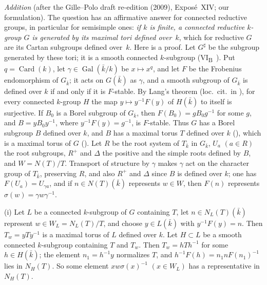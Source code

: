 \emph{Addition} (after the Gille--Polo draft re-edition (2009), Exposé~XIV; our formulation). The question
has an affirmative answer for connected reductive groups, in particular for semisimple ones: \emph{if \(k\) is
finite, a connected reductive \(k\)-group \(G\) is generated by its maximal tori defined over~\(k\)}, which for
reductive \(G\) are its Cartan subgroups defined over~\(k\). Here is a proof. Let \(G^\sharp\) be the subgroup
generated by these tori; it is a smooth connected \(k\)-subgroup
\textup{(VI\textsubscript{B}~)}. Put \(q=\operatorname{Card}(k)\), let
\(\gamma\in\operatorname{Gal}(\bar k/k)\) be \(x\mapsto x^q\), and let \(F\) be the Frobenius endomorphism of
\(G_{\bar k}\); it acts on \(G(\bar k)\) as \(\gamma\), and a smooth subgroup of \(G_{\bar k}\) is defined over
\(k\) if and only if it is \(F\)-stable. By Lang's theorem (loc.\ cit.\ in ), for
every connected \(k\)-group \(H\) the map \(y\mapsto y^{-1}F(y)\) of \(H(\bar k)\) to itself is surjective. If
\(B_0\) is a Borel subgroup of \(G_{\bar k}\), then \(F(B_0)=gB_0g^{-1}\) for some \(g\), and \(B=yB_0y^{-1}\),
where \(y^{-1}F(y)=g^{-1}\), is \(F\)-stable. Thus \(G\) has a Borel subgroup \(B\) defined over \(k\), and \(B\)
has a maximal torus \(T\) defined over \(k\) \textup{()}, which is a maximal torus
of \(G\) \textup{()}. Let \(R\) be the root system of \(T_{\bar k}\) in
\(G_{\bar k}\), \(U_a\) \((a\in R)\) the root subgroups, \(R^+\) and \(\Delta\) the positive and the simple roots
defined by \(B\), and \(W=N(T)/T\). Transport of structure by \(\gamma\) makes \(\gamma\) act on the character
group of \(T_{\bar k}\), preserving \(R\), and also \(R^+\) and \(\Delta\) since \(B\) is defined over \(k\); one
has \(F(U_a)=U_{\gamma a}\), and if \(n\in N(T)(\bar k)\) represents \(w\in W\), then \(F(n)\) represents
\(\sigma(w)=\gamma w\gamma^{-1}\).

\textup{(i)} Let \(L\) be a connected \(k\)-subgroup of \(G\) containing \(T\), let \(n\in N_L(T)(\bar k)\)
represent \(w\in W_L=N_L(T)/T\), and choose \(y\in L(\bar k)\) with \(y^{-1}F(y)=n\). Then \(T_w=yTy^{-1}\) is a
maximal torus of \(L\) defined over \(k\). Let \(H\subset L\) be a smooth connected \(k\)-subgroup containing
\(T\) and \(T_w\). Then \(T_w=hTh^{-1}\) for some \(h\in H(\bar k)\); the element \(n_1=h^{-1}y\) normalizes
\(T\), and \(h^{-1}F(h)=n_1nF(n_1)^{-1}\) lies in \(N_H(T)\). So some element \(xw\sigma(x)^{-1}\)
\((x\in W_L)\) has a representative in \(N_H(T)\).


